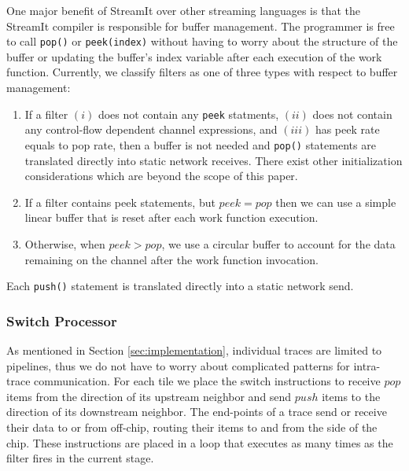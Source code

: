 One major benefit of StreamIt over other streaming languages is that
the StreamIt compiler is responsible for buffer management.  The
programmer is free to call {\tt pop()} or {\tt peek(index)} without
having to worry about the structure of the buffer or updating the
buffer's index variable after each execution of the work function.
Currently, we classify filters as one of three types with respect to
buffer management:
\begin{enumerate}
\item If a filter $(i)$ does not contain any {\tt peek} statments, $(ii)$
does not contain any control-flow dependent channel expressions, and
$(iii)$ has peek rate equals to pop rate, then a buffer is not needed
and {\tt pop()} statements are translated directly into static network
receives.  There exist other initialization considerations which are
beyond the scope of this paper.
\item If a filter contains peek statements, but $peek = pop$ then we can
use a simple linear buffer that is reset after each work function execution.
\item Otherwise, when $peek > pop$, we use a circular buffer to
account for the data remaining on the channel after the work function
invocation.
\end{enumerate}
Each {\tt push()} statement is translated directly into a static
network send.  

\subsubsection{Switch Processor}
As mentioned in Section \ref{sec:implementation}, individual traces
are limited to pipelines, thus we do not have to worry about
complicated patterns for intra-trace communication.  For each tile we
place the switch instructions to receive $pop$ items from the
direction of its upstream neighbor and send $push$ items to the
direction of its downstream neighbor.  The end-points of a trace send
or receive their data to or from off-chip, routing their items to and
from the side of the chip. These instructions are placed in a loop
that executes as many times as the filter fires in the current stage.

